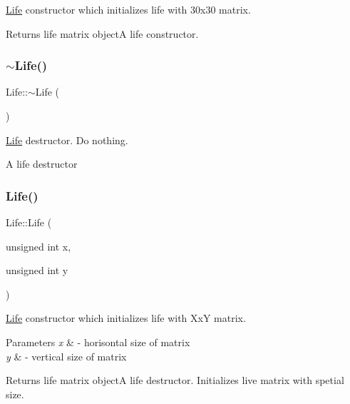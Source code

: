 \mbox{\hyperlink{class_life}{Life}} constructor which initializes life with 30x30 matrix. 

\begin{DoxyReturn}{Returns}
life matrix objectA life constructor. 
\end{DoxyReturn}
\mbox{\label{class_life_ac5a521e06906fb4f834001b2b4f7adc7}} 
\subsubsection{\texorpdfstring{$\sim$\+Life()}{~Life()}}
{\footnotesize\ttfamily Life\+::$\sim$\+Life (\begin{DoxyParamCaption}{ }\end{DoxyParamCaption})}



\mbox{\hyperlink{class_life}{Life}} destructor. Do nothing. 

A life destructor \mbox{\label{class_life_a504a89dac4f882dc86dc4c87a430d48d}} 
\subsubsection{\texorpdfstring{Life()}{Life()}\hspace{0.1cm}{\footnotesize\ttfamily [2/2]}}
{\footnotesize\ttfamily Life\+::\+Life (\begin{DoxyParamCaption}\item[{unsigned int}]{x,  }\item[{unsigned int}]{y }\end{DoxyParamCaption})}



\mbox{\hyperlink{class_life}{Life}} constructor which initializes life with XxY matrix. 


\begin{DoxyParams}{Parameters}
{\em x} & -\/ horisontal size of matrix \\
\hline
{\em y} & -\/ vertical size of matrix \\
\hline
\end{DoxyParams}
\begin{DoxyReturn}{Returns}
life matrix objectA life destructor. Initializes live matrix with spetial size. 
\end{DoxyReturn}


